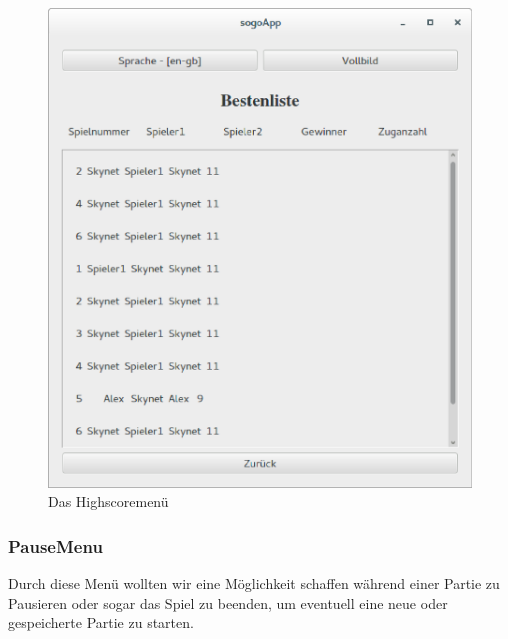 \documentclass[a4paper]{scrartcl}
\begin{document}
\begin{figure}[H]
 	\centering
 	\includegraphics[scale=0.35]{graphics/highscore.eps}
 	\caption{Das Highscoremenü}
 	\label{fig:Highscoremenü}
\end{figure}

\subsubsection{PauseMenu}\label{ch:PauseMenu}
Durch diese Menü wollten wir eine Möglichkeit schaffen während einer Partie zu Pausieren oder sogar das Spiel zu beenden, um eventuell eine neue oder gespeicherte Partie zu starten.
\end{document}

